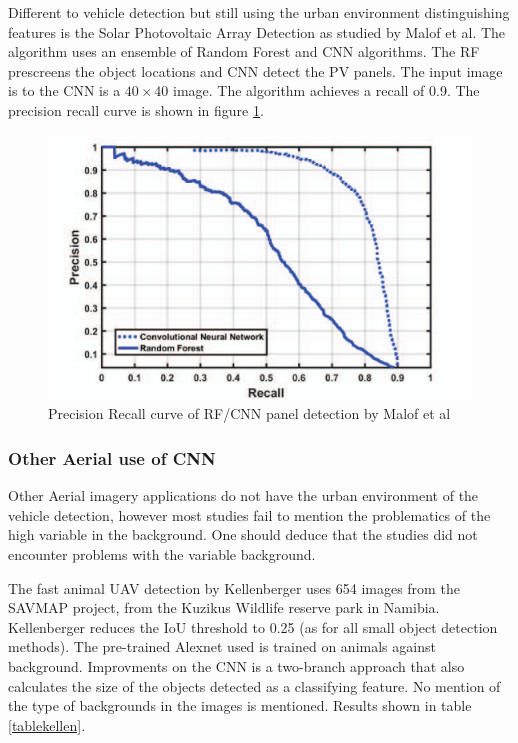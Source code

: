 \documentclass{IEEEtran}
\begin{document}
Different to vehicle detection but still using the urban environment distinguishing features is the Solar Photovoltaic Array Detection as studied by Malof et al\cite{Malof2016}. The algorithm uses an ensemble of Random Forest and CNN algorithms. The RF prescreens the object locations and CNN detect the PV panels. The input image is to the CNN is a $40 \times 40$ image. The algorithm achieves a recall of 0.9. The precision recall curve is shown in figure \ref{curvepanel}.

\begin{figure}[h]
\centering
\label{curvepanel}
\includegraphics[scale=0.4]{images/pvpanels.png}
\caption{Precision Recall curve of RF/CNN panel detection by Malof et al \cite{Malof2016}}
\end{figure}


\subsubsection{Other Aerial use of CNN}

Other Aerial imagery applications do not have the urban environment of the vehicle detection, however most studies fail to mention the problematics of the high variable in the background. One should deduce that the studies did not encounter problems with the variable background.\newline

The fast animal UAV detection by Kellenberger \cite{Kellenberger2017} uses 654 images from the SAVMAP project, from the Kuzikus Wildlife reserve park in Namibia. Kellenberger reduces the IoU threshold to 0.25 (as for all small object detection methods). The pre-trained Alexnet used is trained on animals against background. Improvments on the CNN is a two-branch approach that also calculates the size of the objects detected as a classifying feature. No mention of the type of backgrounds in the images is mentioned. Results shown in table \ref{tablekellen}. 
\end{document}
